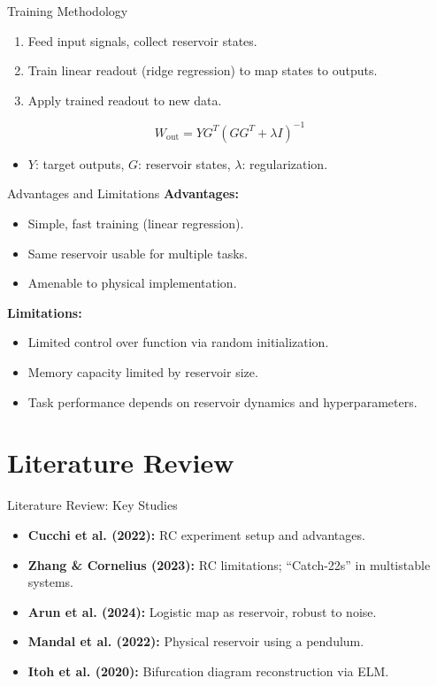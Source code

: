 \documentclass{beamer}
\begin{document}
\begin{frame}{Training Methodology}
  \begin{enumerate}
    \item Feed input signals, collect reservoir states.
    \item Train linear readout (ridge regression) to map states to outputs.
    \item Apply trained readout to new data.
  \end{enumerate}
  \[
    W_{\text{out}} = YG^T\left(GG^T + \lambda I\right)^{-1}
  \]
  \begin{itemize}
    \item $Y$: target outputs, $G$: reservoir states, $\lambda$: regularization.
  \end{itemize}
\end{frame}

\begin{frame}{Advantages and Limitations}
  \textbf{Advantages:}
  \begin{itemize}
    \item Simple, fast training (linear regression).
    \item Same reservoir usable for multiple tasks.
    \item Amenable to physical implementation.
  \end{itemize}
  \vspace{0.2cm}
  \textbf{Limitations:}
  \begin{itemize}
    \item Limited control over function via random initialization.
    \item Memory capacity limited by reservoir size.
    \item Task performance depends on reservoir dynamics and hyperparameters.
  \end{itemize}
\end{frame}

\section{Literature Review}
\begin{frame}{Literature Review: Key Studies}
  \begin{itemize}
    \item \textbf{Cucchi et al. (2022):} RC experiment setup and advantages.
    \item \textbf{Zhang \& Cornelius (2023):} RC limitations; “Catch-22s” in multistable systems.
    \item \textbf{Arun et al. (2024):} Logistic map as reservoir, robust to noise.
    \item \textbf{Mandal et al. (2022):} Physical reservoir using a pendulum.
    \item \textbf{Itoh et al. (2020):} Bifurcation diagram reconstruction via ELM.
  \end{itemize}
\end{frame}
\end{document}
